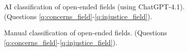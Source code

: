 \begin{figure}[h!]
    \caption[AI classification of open-ended fields]{AI classification of open-ended fields (using ChatGPT-4.1). (Questions \ref{q:concerns_field}-\ref{q:injustice_field}).
    }\label{fig:field_gpt}
\end{figure}

\begin{figure}[h!]
    \caption[Manual classification of open-ended fields]{Manual classification of open-ended fields. (Questions \ref{q:concerns_field}-\ref{q:injustice_field}).
    }\label{fig:field_manual}
\end{figure}

